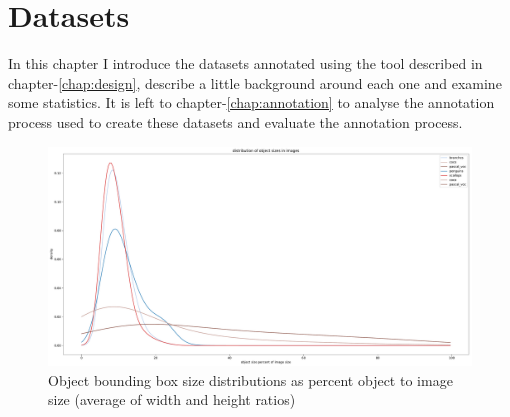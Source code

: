 \chapter{Datasets}
\label{chap:datasets} 

In this chapter I introduce the datasets annotated using the tool described in chapter-\ref{chap:design}, describe a little background around each one and examine some statistics. It is left to chapter-\ref{chap:annotation} to  analyse the annotation process used to create these datasets and evaluate the annotation process.





\begin{figure}[ht]
\centering
\includegraphics[width=0.9\linewidth]{charts/summaries/sizes_density.pdf}
\caption{Object bounding box size distributions as percent object to image size (average of width and height ratios) }
\label{fig:box_sizes}
\end{figure}







